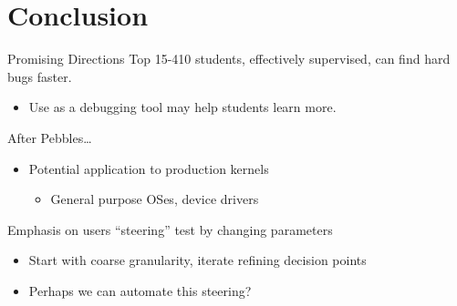 \documentclass[xcolor=dvipsnames]{beamer}
\begin{document}
\section{Conclusion}

%
%
%

\begin{frame}{Promising Directions}
	Top 15-410 students, effectively supervised, can find hard bugs faster.
	\begin{itemize}
		\item Use as a debugging tool may help students learn more.
	\end{itemize}
	\linegap

	After Pebbles\dots
	\begin{itemize}
		\item Potential application to production kernels
		\begin{itemize}
			\item General purpose OSes, device drivers
		\end{itemize}
	\end{itemize}
	\linegap

	Emphasis on users ``steering'' test by changing parameters
	\begin{itemize}
		\item Start with coarse granularity, iterate refining decision points
		\item Perhaps we can automate this steering?
	\end{itemize}
	\linegap
\end{frame}
\end{document}
